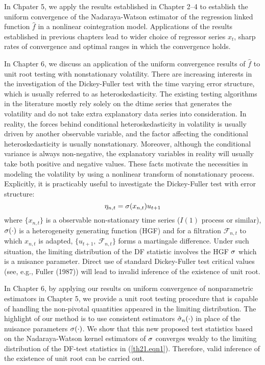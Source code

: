 In Chpater 5, we apply the results established in Chapter 2--4 to establish the uniform convergence of the Nadaraya-Watson estimator of the regression linked function $\hat{f}$ in a nonlinear cointegration model. Applications of the results established in previous chapters lead to wider choice of regressor series $x_t$, sharp rates of convergence and optimal ranges in which the convergence holds. 

In Chapter 6, we discuss an application of the uniform convergence results of $\hat{f}$ to unit root testing with nonstationary volatility. There are increasing interests in the investigation of the Dickey-Fuller test with the time varying error structure, which is  usually referred to as heteroskedasticity. The existing testing algorithms in the literature mostly rely solely on the  dtime series that generates the volatility  and do not  take extra explanatory data series into consideration. In reality, the forces behind conditional heteroskedasticity in volatility is usually driven by another observable variable, and the factor affecting the conditional heteroskedasticity is usually nonstationary. Moreover, although the conditional variance is always non-negative, the explanatory variables in reality will usually take both positive and negative values. These facts motivate the necessities in  modeling the volatility by using a nonlinear transform of nonstationary process. Explicitly, it is practicably useful to investigate  the Dickey-Fuller
 test with  error structure:
\begin{equation} \la{eqn11}
\eta_{n,t} = \si (x_{n,t}) u_{t+1}
\end{equation}
where $\{x_{n,t}\}$ is a observable  non-stationary time series ($I(1)$ process or similar), $\sigma(\cdot)$ is  a heterogeneity generating
function (HGF) and for a filtration $\mathcal{F}_{n,t}$ to which $x_{n,t}$
is adapted, $\{u_{t+1},\ {\mathcal{F}_{n,t}}\}$ forms a martingale difference. Under such situation, the limiting distribution of the DF statistic involves the HGF $\sigma$  which is a nuisance parameter. Direct use of standard Dickey-Fuller test critical values (see, e.g., Fuller (1987)) will lead to invalid inference of the existence of unit root.

In Chapter 6, by applying our results on uniform convergence of nonparametric estimators in Chapter 5, we provide a unit root testing procedure that is capable of handling the non-pivotal quantities appeared in the limiting distribution. The highlight of our method is to use  consistent estimators $\hat{\sigma}_n(\cdot)$ in place of the nuisance parameters $\sigma(\cdot)$. We show that this new proposed test statistics based on the Nadaraya-Watson kernel estimators of $\sigma$ converges weakly to the limiting distribution of the DF-test statistics in (\ref{th21.eqn1}). Therefore, valid inference of the existence of unit root can be carried out.

